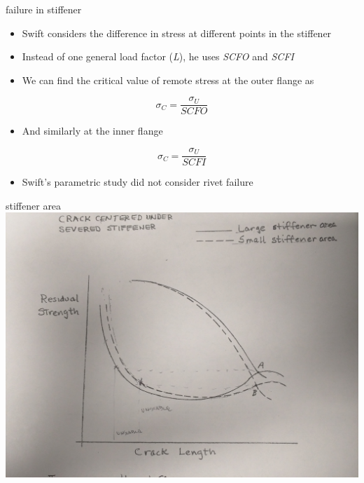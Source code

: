 \documentclass[
  letterpaper,
  ignorenonframetext,
  aspectratio=43,
  handout,
  12pt]{beamer}
\providecommand{\tightlist}{%
  \setlength{\itemsep}{0pt}\setlength{\parskip}{0pt}}
\providecommand{\tightlist}{%
\setlength{\itemsep}{0pt}\setlength{\parskip}{0pt}}
\let\Oldincludegraphics\includegraphics
\renewcommand{\includegraphics}[2][]{\Oldincludegraphics[width=\textwidth,height=0.7\textheight,keepaspectratio]{#2}}
\begin{document}
\begin{frame}{failure in stiffener}
\protect\hypertarget{failure-in-stiffener-1}{}
\begin{itemize}
\tightlist
\item
  Swift considers the difference in stress at different points in the
  stiffener
\item
  Instead of one general load factor (\emph{L}), he uses \emph{SCFO} and
  \emph{SCFI}
\item
  We can find the critical value of remote stress at the outer flange as
\end{itemize}

\[\sigma_C = \frac{\sigma_U}{SCFO}\]

\begin{itemize}
\tightlist
\item
  And similarly at the inner flange
\end{itemize}

\[\sigma_C = \frac{\sigma_U}{SCFI}\]

\begin{itemize}
\tightlist
\item
  Swift's parametric study did not consider rivet failure
\end{itemize}
\end{frame}

\begin{frame}{stiffener area}
\protect\hypertarget{stiffener-area}{}
\includegraphics{../images/stiffener_area.jpg}
\end{frame}
\end{document}
